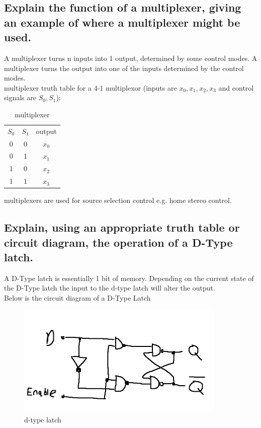 \documentclass{article}
\begin{document}
\subsection{Explain the function of a multiplexer, giving an example of where a multiplexer might be used.}
A multiplexer turns n inputs into 1 output, determined by some control modes. A multiplexer turns the output into one of the inputs determined by the control modes.\\
multiplexer truth table for a 4-1 multiplexor (inputs are $x_0, x_1, x_2, x_3$ and control signals are $S_0, S_1$):\\
\begin{table}[h]
    \centering
    \begin{tabular}{|c c|c|}
        $S_0$ & $S_1$ & output\\
        0 & 0 & $x_0$\\
        0 & 1 & $x_1$\\
        1 & 0 & $x_2$\\
        1 & 1 & $x_3$
    \end{tabular}
    \caption{multiplexer}
    \label{tab:my_label}
\end{table}

multiplexers are used for source selection control e.g. home stereo control.

\subsection{Explain, using an appropriate truth table or circuit diagram, the operation of a D-Type latch.}
A D-Type latch is essentially 1 bit of memory. Depending on the current state of the D-Type latch the input to the d-type latch will alter the output.\\
Below is the circuit diagram of a D-Type Latch
\begin{figure}[h]
    \centering
    \includegraphics[width=100mm]{digitalLogic6.PNG}
    \caption{d-type latch}
    \label{fig:my_label}
\end{figure}
\end{document}
